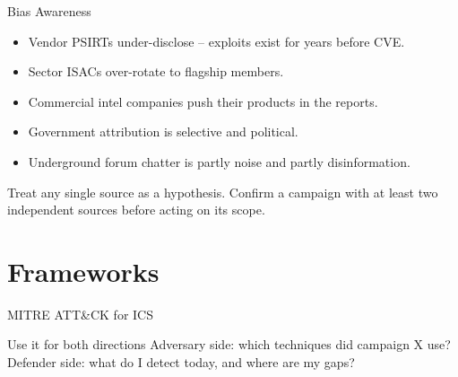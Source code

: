 \documentclass[aspectratio=169,11pt]{beamer}
\begin{document}
\begin{frame}{Bias Awareness}
\begin{itemize}
  \item Vendor PSIRTs under-disclose -- exploits exist for years before CVE.
  \item Sector ISACs over-rotate to flagship members.
  \item Commercial intel companies push their products in the reports.
  \item Government attribution is selective and political.
  \item Underground forum chatter is partly noise and partly disinformation.
\end{itemize}
\begin{warnbox}
Treat any single source as a hypothesis. Confirm a campaign with at least two independent sources before acting on its scope.
\end{warnbox}
\end{frame}

\section{Frameworks}

\begin{frame}{MITRE ATT\&CK for ICS}
\centering
{}
\vspace{2mm}
\begin{notebox}{Use it for both directions}
Adversary side: which techniques did campaign X use? Defender side: what do I detect today, and where are my gaps?
\end{notebox}
\end{frame}
\end{document}
